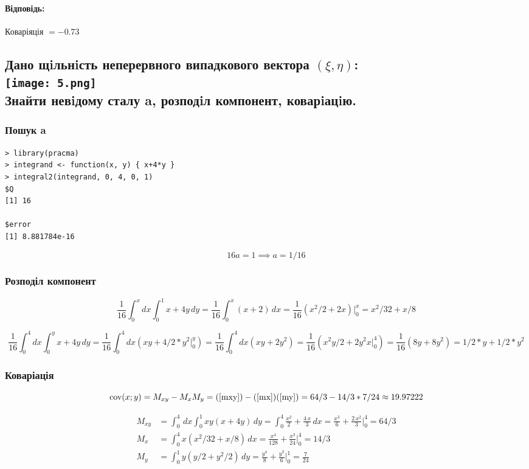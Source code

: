 \documentclass[a4paper, 12pt, oneside]{extarticle}
\newcommand{\Problem}{\subsection}
\newcommand{\Answer}[1]{
\medskip
\null\hfill
\begin{boxedminipage}{\textwidth}
	\paragraph{Відповідь: }{#1}
\end{boxedminipage}
}
\begin{document}
\Answer{
	Коваріяція $= -0.73$
}

\Problem{
	Дано щiльнiсть неперервного випадкового вектора $(\xi, \eta)$:
	\\
	\texttt{[image: 5.png]}
	\\
	Знайти невiдому сталу a, розподiл компонент, коварiацiю.
}


\subsubsection{Пошук a}

\begin{verbatim}
> library(pracma)
> integrand <- function(x, y) { x+4*y }
> integral2(integrand, 0, 4, 0, 1)
$Q
[1] 16

$error
[1] 8.881784e-16
\end{verbatim}

$$
16a = 1 \implies a = 1/16
$$

\subsubsection{Розподіл компонент}

$$
\frac{1}{16}\int_0^x dx \int_0^1 x+4y\, dy
= \frac{1}{16}\int_0^x \left( x + 2 \right) \,dx
= \frac{1}{16} \left( x^2/2 + 2x \right) \Big|_0^x
= x^2/32 + x/8
$$

\begin{dmath}
\frac{1}{16}\int_0^4 dx \int_0^y x+4y\, dy
= \frac{1}{16}\int_0^4 dx \left( xy + 4/2*y^2 \Big|_0^y \right)
= \frac{1}{16}\int_0^4 dx \left( xy + 2y^2 \right)
= \frac{1}{16}\left( x^2y/2 + 2y^2x \Big|_0^4 \right)
= \frac{1}{16}\left( 8y + 8y^2 \right)
= 1/2*y + 1/2*y^2
\end{dmath}

\subsubsection{Коваріація}

$$
\text{cov}(x;y) = M_{xy} - M_xM_y %
= (\ref{mxy}) - (\ref{mx})(\ref{my})
= 64/3 - 14/3 * 7/24 \approx 19.97222
$$

\fboxrule=0.5pt
\begin{boxedminipage}{\textwidth}
\begin{align}
	M_{xy} &= \int_0^4 \,dx \int_0^1 xy (x+4y) \,dy
		= \int_0^4 \frac{{x}^{2}}{2}+\frac{4\,x}{3} \,dx
		= \frac{{x}^{3}}{6}+\frac{2\,{x}^{2}}{3} \Bigg|_0^4
		= 64/3
		\label{mxy}
\\
	M_x &= \int_0^4 x(x^2/32 + x/8) \,dx = \frac{{x}^{4}}{128}+\frac{{x}^{3}}{24} \Bigg|_0^4 = 14/3
	\label{mx}
\\
	M_y &= \int_0^1 y(y/2 + y^2/2) \,dy = \frac{{y}^{4}}{8}+\frac{{y}^{3}}{6} \Bigg|_0^1 = \frac{7}{24}
	\label{my}
\end{align}
\end{boxedminipage}
\end{document}
